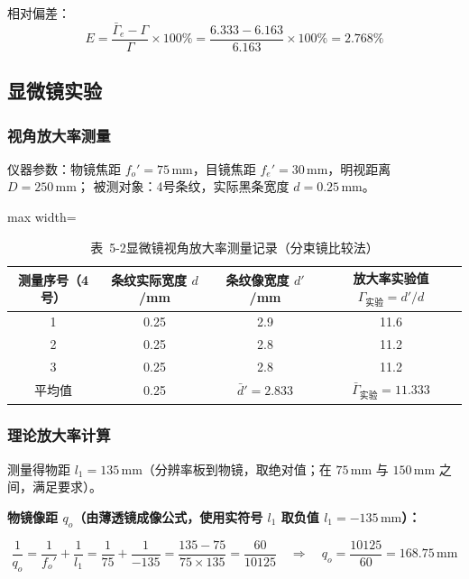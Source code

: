 \documentclass[12pt, a4paper]{article}
\begin{document}
相对偏差：
\begin{equation}
  E = \frac{\bar{\Gamma}_e - \Gamma}{\Gamma}\times 100\%
    = \frac{6.333 - 6.163}{6.163}\times 100\%
    = 2.768\%
  \label{eq:E_telescope}
\end{equation}

\subsection{显微镜实验}

\subsubsection{视角放大率测量}

仪器参数：物镜焦距 $f_o'=75\,\text{mm}$，目镜焦距 $f_e'=30\,\text{mm}$，明视距离 $D=250\,\text{mm}$；
被测对象：4号条纹，实际黑条宽度 $d=0.25\,\text{mm}$。

\begin{table}[H]
  \caption{表~5-2\quad 显微镜视角放大率测量记录（分束镜比较法）}
  \label{tab:microscope}
  \centering
  \begin{adjustbox}{max width=\textwidth}
    \begin{tabular}{cccc}
      \toprule
      测量序号（4号） & 条纹实际宽度 $d$/mm & 条纹像宽度 $d'$/mm & 放大率实验值 $\Gamma_{\text{实验}} = d'/d$ \\
      \midrule
      1 & 0.25 & 2.9  & 11.6 \\
      2 & 0.25 & 2.8  & 11.2 \\
      3 & 0.25 & 2.8  & 11.2 \\
      \midrule
      平均值 & 0.25 & $\bar{d}' = 2.833$ & $\bar{\Gamma}_{\text{实验}} = 11.333$ \\
      \bottomrule
    \end{tabular}
  \end{adjustbox}
\end{table}

\subsubsection{理论放大率计算}

测量得物距 $l_1 = 135\,\text{mm}$（分辨率板到物镜，取绝对值；在 $75\,\text{mm}$ 与 $150\,\text{mm}$ 之间，满足要求）。

\textbf{物镜像距 $q_o$（由薄透镜成像公式，使用实符号 $l_1$ 取负值 $l_1 = -135\,\text{mm}$）：}

\begin{equation}
  \frac{1}{q_o} = \frac{1}{f_o'} + \frac{1}{l_1}
               = \frac{1}{75} + \frac{1}{-135}
               = \frac{135 - 75}{75\times 135}
               = \frac{60}{10125}
  \quad\Rightarrow\quad q_o = \frac{10125}{60} = 168.75\,\text{mm}
  \label{eq:qo}
\end{equation}
\end{document}

